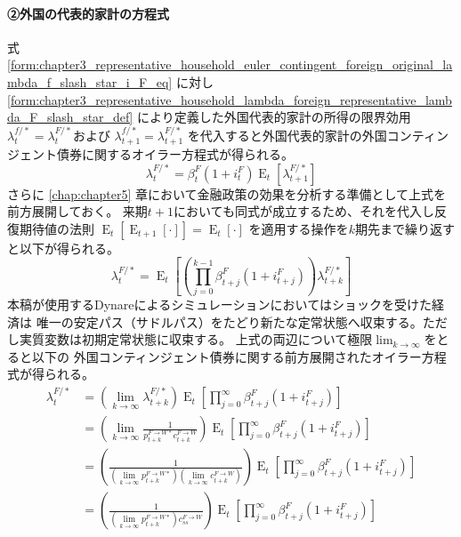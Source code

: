 \paragraph{②外国の代表的家計の方程式}
\label{sec:chapter3_representative_household_euler_contingent_foreign_representative}
式
\eqref{form:chapter3_representative_household_euler_contingent_foreign_original_lambda_f_slash_star_i_F_eq}
に対し
\eqref{form:chapter3_representative_household_lambda_foreign_representative_lambda_F_slash_star_def}
により定義した外国代表的家計の所得の限界効用
\(\lambda_t^{f/*}=\lambda_t^{F/*}\)および
\(\lambda_{t+1}^{f/*}=\lambda_{t+1}^{F/*}\)
を代入すると外国代表的家計の外国コンティンジェント債券に関するオイラー方程式が得られる。
\begin{equation}
\label{form:chapter3_representative_household_euler_contingent_foreign_representative_lambda_F_slash_star_i_F_eq}
    \lambda_t^{F/*}=\beta_t^F(1+i_t^F)\operatorname{E}_t[\lambda_{t+1}^{F/*}]
\end{equation}
さらに
\ref{chap:chapter5}
章において金融政策の効果を分析する準備として上式を前方展開しておく。
来期\(t+1\)においても同式が成立するため、それを代入し反復期待値の法則
\(\operatorname{E}_t[\operatorname{E}_{t+1}[\cdot]]=\operatorname{E}_t[\cdot]\)
を適用する操作を\(k\)期先まで繰り返すと以下が得られる。
\begin{equation}
\label{form:chapter3_representative_household_euler_contingent_foreign_representative_lambda_F_slash_star_i_F_forward_eq}
    \lambda_t^{F/*}
    =\operatorname{E}_t\left[\left(\prod_{j=0}^{k-1}\beta_{t+j}^F(1+i_{t+j}^F)\right)\lambda_{t+k}^{F/*}\right]
\end{equation}
本稿が使用するDynareによるシミュレーションにおいてはショックを受けた経済は
唯一の安定パス（サドルパス）をたどり新たな定常状態へ収束する。ただし実質変数は初期定常状態に収束する。
上式の両辺について極限\(\lim_{k\to\infty}\)をとると以下の
外国コンティンジェント債券に関する前方展開されたオイラー方程式が得られる。
\begin{equation}
\label{form:chapter3_representative_household_euler_contingent_foreign_representative_lambda_F_slash_star_i_F_lim_eq}
    \begin{aligned}
        \lambda_t^{F/*}
        &=(\lim_{k\to\infty}\lambda_{t+k}^{F/*})\operatorname{E}_t\left[\prod_{j=0}^{\infty}\beta_{t+j}^F(1+i_{t+j}^F)\right] \\
        &=(\lim_{k\to\infty}\frac{1}{p_{t+k}^{F\to W*}c_{t+k}^{F\to W}})\operatorname{E}_t\left[\prod_{j=0}^{\infty}\beta_{t+j}^F(1+i_{t+j}^F)\right] \\
        &=(\frac{1}{(\lim_{k\to\infty}p_{t+k}^{F\to W*})(\lim_{k\to\infty}c_{t+k}^{F\to W})})\operatorname{E}_t\left[\prod_{j=0}^{\infty}\beta_{t+j}^F(1+i_{t+j}^F)\right] \\
        &=(\frac{1}{(\lim_{k\to\infty}p_{t+k}^{F\to W*})c_{ss}^{F\to W}})\operatorname{E}_t\left[\prod_{j=0}^{\infty}\beta_{t+j}^F(1+i_{t+j}^F)\right]
    \end{aligned}
\end{equation}